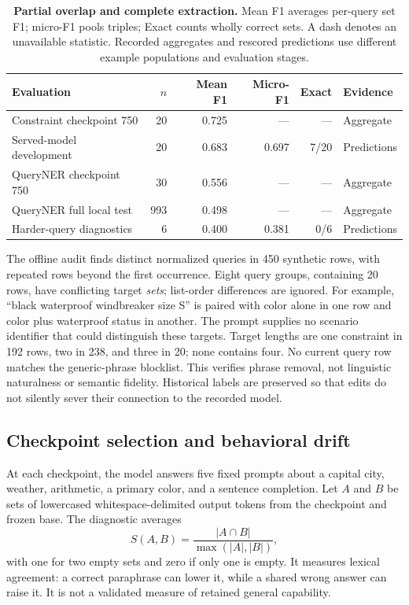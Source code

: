 \documentclass{article}
\begin{document}
\begin{table}[htbp]
\centering
\caption{\textbf{Partial overlap and complete extraction.} Mean F1 averages per-query set F1; micro-F1 pools triples; Exact counts wholly correct sets. A dash denotes an unavailable statistic. Recorded aggregates and rescored predictions use different example populations and evaluation stages.}
\label{tab:results}
\small
\begin{tabularx}{\linewidth}{@{}Xrrrrl@{}}
\toprule
Evaluation & $n$ & Mean F1 & Micro-F1 & Exact & Evidence \\
\midrule
Constraint checkpoint 750 & 20 & 0.725 & --- & --- & Aggregate \\
Served-model development & 20 & 0.683 & 0.697 & 7/20 & Predictions \\
QueryNER checkpoint 750 & 30 & 0.556 & --- & --- & Aggregate \\
QueryNER full local test & 993 & 0.498 & --- & --- & Aggregate \\
Harder-query diagnostics & 6 & 0.400 & 0.381 & 0/6 & Predictions \\
\bottomrule
\end{tabularx}
\end{table}

The offline audit finds \SyntheticUniqueN{} distinct normalized queries in 450 synthetic rows, with \SyntheticDuplicateN{} repeated rows beyond the first occurrence. Eight query groups, containing 20 rows, have conflicting target \emph{sets}; list-order differences are ignored. For example, ``black waterproof windbreaker size S'' is paired with color alone in one row and color plus waterproof status in another. The prompt supplies no scenario identifier that could distinguish these targets. Target lengths are one constraint in 192 rows, two in 238, and three in 20; none contains four. No current query row matches the generic-phrase blocklist. This verifies phrase removal, not linguistic naturalness or semantic fidelity. Historical labels are preserved so that edits do not silently sever their connection to the recorded model.



\subsection{Checkpoint selection and behavioral drift}
At each checkpoint, the model answers five fixed prompts about a capital city, weather, arithmetic, a primary color, and a sentence completion. Let $A$ and $B$ be sets of lowercased whitespace-delimited output tokens from the checkpoint and frozen base. The diagnostic averages
\begin{equation}
S(A,B)=\frac{|A\cap B|}{\max(|A|,|B|)},
\end{equation}
with one for two empty sets and zero if only one is empty. It measures lexical agreement: a correct paraphrase can lower it, while a shared wrong answer can raise it. It is not a validated measure of retained general capability.
\end{document}
